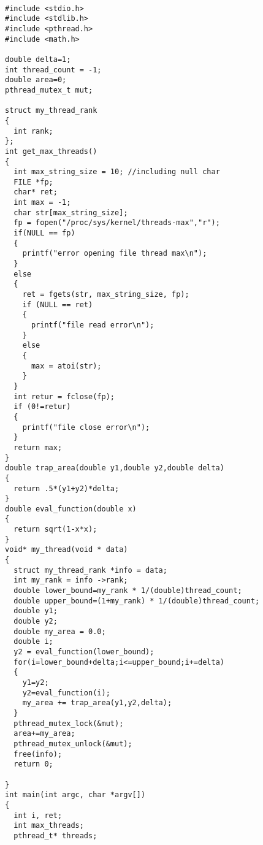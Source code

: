 \documentclass{article}
\begin{document}
\begin{lstlisting}

#include <stdio.h>
#include <stdlib.h>
#include <pthread.h>
#include <math.h>

double delta=1;
int thread_count = -1; 
double area=0;
pthread_mutex_t mut;

struct my_thread_rank
{
  int rank;
};
int get_max_threads()
{
  int max_string_size = 10; //including null char
  FILE *fp;
  char* ret;
  int max = -1;
  char str[max_string_size];
  fp = fopen("/proc/sys/kernel/threads-max","r");
  if(NULL == fp)
  {
    printf("error opening file thread max\n");
  }
  else
  {
    ret = fgets(str, max_string_size, fp);
    if (NULL == ret)
    {
      printf("file read error\n");
    }
    else
    {
      max = atoi(str);
    }
  }
  int retur = fclose(fp);
  if (0!=retur)
  {
    printf("file close error\n");
  }
  return max;
}
double trap_area(double y1,double y2,double delta)
{
  return .5*(y1+y2)*delta;
}
double eval_function(double x)
{
  return sqrt(1-x*x);
}
void* my_thread(void * data)
{
  struct my_thread_rank *info = data;
  int my_rank = info ->rank;
  double lower_bound=my_rank * 1/(double)thread_count;
  double upper_bound=(1+my_rank) * 1/(double)thread_count;
  double y1;
  double y2;
  double my_area = 0.0;
  double i;
  y2 = eval_function(lower_bound);
  for(i=lower_bound+delta;i<=upper_bound;i+=delta)
  {
    y1=y2;
    y2=eval_function(i);
    my_area += trap_area(y1,y2,delta);
  }
  pthread_mutex_lock(&mut);
  area+=my_area; 
  pthread_mutex_unlock(&mut);
  free(info);
  return 0;

}
int main(int argc, char *argv[])
{
  int i, ret;
  int max_threads;
  pthread_t* threads;


\end{lstlisting}
\end{document}
